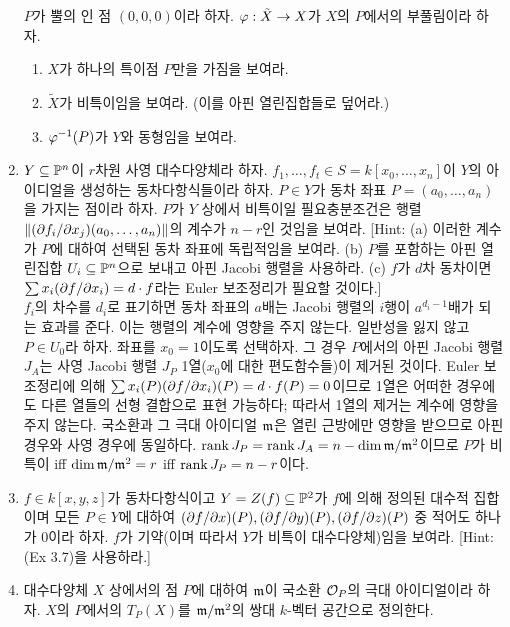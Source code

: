 \begin{enumerate}[label=\tb{5.\arabic*.},itemindent=0mm,itemsep=4mm]
	$P$가 뿔의 인 점 $(0,0,0)$이라 하자. $\varphi:\tilde X\rightarrow X$가 $X$의 $P$에서의 부풀림이라 하자.
	\begin{enumerate}[label=(\alph*)]
	\item $X$가 하나의 특이점 $P$만을 가짐을 보여라.
	\item $\tilde X$가 비특이임을 보여라. (이를 아핀 열린집합들로 덮어라.)
	\item $\varphi^{-1}(P)$가 $Y$와 동형임을 보여라.
	\end{enumerate}
	\item $Y\subseteq\mathbb{P}^n$이 $r$차원 사영 대수다양체라 하자.
	$f_1,\ldots,f_t\in S=k[x_0,\ldots,x_n]$이 $Y$의 아이디얼을 생성하는 동차다항식들이라 하자.
	$P\in Y$가 동차 좌표 $P=(a_0,\ldots,a_n)$을 가지는 점이라 하자.
	$P$가 $Y$ 상에서 비특이일 필요충분조건은 행렬 $\|(\partial f_i/\partial x_j)(a_0,\ldots,a_n)\|$의 계수가 $n-r$인 것임을 보여라.
	[Hint: (a) 이러한 계수가 $P$에 대하여 선택된 동차 좌표에 독립적임을 보여라.
	(b) $P$를 포함하는 아핀 열린집합 $U_i\subseteq\mathbb{P}^n$으로 보내고 아핀 Jacobi 행렬을 사용하라.
	(c) $f$가 $d$차 동차이면 $\sum x_i(\partial f/\partial x_i)=d\cdot f$라는 Euler 보조정리가 필요할 것이다.]\\
	\sol $f_i$의 차수를 $d_i$로 표기하면 동차 좌표의 $a$배는 Jacobi 행렬의 $i$행이 $a^{d_i-1}$배가 되는 효과를 준다.
	이는 행렬의 계수에 영향을 주지 않는다.
	일반성을 잃지 않고 $P\in U_0$라 하자. 좌표를 $x_0=1$이도록 선택하자.
	그 경우 $P$에서의 아핀 Jacobi 행렬 $J_A$는 사영 Jacobi 행렬 $J_P$ 1열($x_0$에 대한 편도함수들)이 제거된 것이다.
	Euler 보조정리에 의해 $\sum x_i(P)(\partial f/\partial x_i)(P)=d\cdot f(P)=0$이므로
	1열은 어떠한 경우에도 다른 열들의 선형 결합으로 표현 가능하다; 따라서 1열의 제거는 계수에 영향을 주지 않는다.
	국소환과 그 극대 아이디얼 $\mathfrak{m}$은 열린 근방에만 영향을 받으므로 아핀 경우와 사영 경우에 동일하다.
	$\operatorname{rank} J_P=\operatorname{rank} J_A=n-\dim\mathfrak{m}/\mathfrak{m}^2$이므로 $P$가 비특이 iff $\dim\mathfrak{m}/\mathfrak{m}^2=r$ iff $\operatorname{rank} J_P=n-r$이다.
	\item $f\in k[x,y,z]$가 동차다항식이고 $Y=Z(f)\subseteq\mathbb{P}^2$가 $f$에 의해 정의된 대수적 집합이며
	모든 $P\in Y$에 대하여 $(\partial f/\partial x)(P),(\partial f/\partial y)(P),(\partial f/\partial z)(P)$ 중 적어도 하나가 0이라 하자.
	$f$가 기약(이며 따라서 $Y$가 비특이 대수다양체)임을 보여라. [Hint: (Ex 3.7)을 사용하라.]
	\item 대수다양체 $X$ 상에서의 점 $P$에 대하여 $\mathfrak{m}$이 국소환 $\mathcal{O}_P$의 극대 아이디얼이라 하자.
	$X$의 $P$에서의  $T_P(X)$를 $\mathfrak{m}/\mathfrak{m}^2$의 쌍대 $k$-벡터 공간으로 정의한다.
	\begin{enumerate}[label=(\alph*)]

\end{enumerate}
\end{enumerate}
